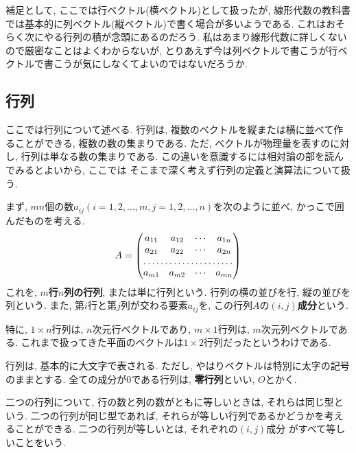\documentclass[a4j,dvipdfmx]{jsarticle}
\numberwithin{equation}{section}
\begin{document}
            補足として, ここでは行ベクトル(横ベクトル)として扱ったが, 線形代数の教科書では基本的に列ベクトル(縦ベクトル)で書く場合が多いようである. これはおそらく次にやる行列の積が念頭にあるのだろう. 
            私はあまり線形代数に詳しくないので厳密なことはよくわからないが, とりあえず今は列ベクトルで書こうが行ベクトルで書こうが気にしなくてよいのではないだろうか.
        \clearpage
        \subsection{行列}
            ここでは行列について述べる. 行列は, 複数のベクトルを縦または横に並べて作ることができる, 複数の数の集まりである. ただ, ベクトルが物理量を表すのに対し, 行列は単なる数の集まりである. この違いを意識するには相対論の部を読んでみるとよいから, ここでは
            そこまで深く考えず行列の定義と演算法について扱う.

            
            まず, $mn$個の数$a_{ij}(i=1,2,\dots,m,j=1,2,\dots,n)$を次のように並べ, かっこで囲んだものを考える.
            \begin{equation}
                A=\begin{pmatrix}
                    a_{11} & a_{12} & \cdots & a_{1n}\\
                    a_{21} & a_{22} & \cdots & a_{2n}\\
                    \hdotsfor{4}\\
                    a_{m1} & a_{m2} & \cdots & a_{mn}
                \end{pmatrix} \label{eq:線形代数:行列の定義}
            \end{equation}
            これを, \textbf{$m$行$n$列の行列}, または単に行列という. 行列の横の並びを行, 縦の並びを列という.
            また, 第$i$行と第$j$列が交わる要素$a_{ij}$を, この行列$A$の\textbf{$(i,j)$成分}という.

            特に, $1\times n$行列は, $n$次元行ベクトルであり, $m\times 1$行列は, $m$次元列ベクトルである. これまで扱ってきた平面のベクトルは$1\times 2$行列だったというわけである.

            行列は, 基本的に大文字で表される. ただし, やはりベクトルは特別に太字の記号のままとする. 全ての成分が0である行列は, \textbf{零行列}といい, $O$とかく.

            二つの行列について, 行の数と列の数がともに等しいときは, それらは同じ型という. 二つの行列が同じ型であれば, それらが等しい行列であるかどうかを考えることができる. 二つの行列が等しいとは, それぞれの$(i,j)$成分
            がすべて等しいことをいう.
\end{document}
